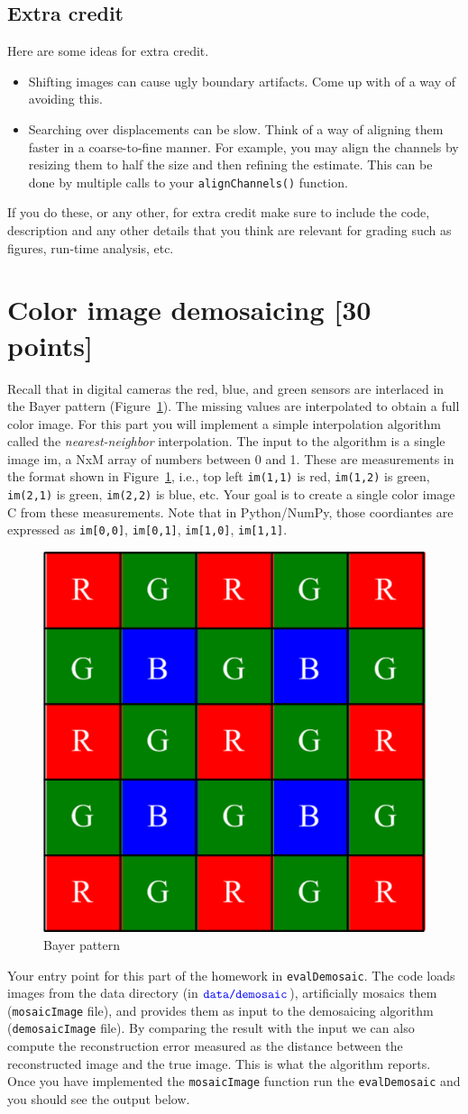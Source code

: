\documentclass[10pt,letterpaper]{article}
\newcommand{\cmd}[1] {{\color{blue}\texttt{#1}}}
\begin{document}
\subsection{Extra credit}
Here are some ideas for extra credit.
\begin{itemize}
\item Shifting images can cause ugly boundary artifacts. Come up with of a way of avoiding this.
\item Searching over displacements can be slow. Think of a way of aligning them faster in a coarse-to-fine manner. For example, you may align the channels by resizing them to half the size and then refining the estimate. This can be done by multiple calls to your \cmd{alignChannels()} function.
\end{itemize}
If you do these, or any other, for extra credit make sure to include the code, description and any other details that you think are relevant for grading such as figures, run-time analysis, etc.

\newpage
\section{Color image demosaicing [30 points]}
Recall that in digital cameras the red, blue, and green sensors are interlaced in the Bayer pattern (Figure~\ref{fig:bayer}). The missing values are interpolated to obtain a full color image. For this part you will implement a simple interpolation algorithm called the \emph{nearest-neighbor} interpolation. The input to the algorithm is a single image im, a NxM array of numbers between 0 and 1. These are measurements in the format shown in Figure~\ref{fig:bayer}, i.e., top left \cmd{im(1,1)} is red, \cmd{im(1,2)} is green, \cmd{im(2,1)} is green, \cmd{im(2,2)} is blue, etc. Your goal is to create a single color image C from these measurements. Note that in Python/NumPy, those coordiantes are expressed as \cmd{im[0,0]}, \cmd{im[0,1]}, \cmd{im[1,0]}, \cmd{im[1,1]}.
\begin{figure}[h]
\centering
\includegraphics[width=0.2\linewidth]{bayer-pattern.png}
\caption{\label{fig:bayer} Bayer pattern}
\end{figure}

Your entry point for this part of the homework in \cmd{evalDemosaic}. The code loads images from the data directory (in $\cmd{data/demosaic}$), artificially mosaics them (\cmd{mosaicImage} file), and provides them as input to the demosaicing algorithm (\cmd{demosaicImage} file). By comparing the result with the input we can also compute the reconstruction error measured as the distance between the reconstructed image and the true image. This is what the algorithm reports. Once you have implemented the \cmd{mosaicImage} function run the \cmd{evalDemosaic} and you should see the output below.
\end{document}
